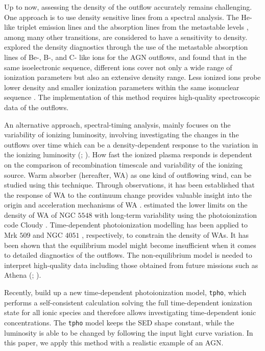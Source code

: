 \documentclass{aa}
\begin{document}
Up to now, assessing the density of the outflow accurately remains challenging.
One approach is to use density sensitive lines from a spectral analysis.
The He-like triplet emission lines \citep{Porquet2010SSR} and the absorption lines from the metastable levels \citep{Arav2015AA}, among many other transitions, are considered to have a sensitivity to density.
\cite{Mao2017A&A} explored the density diagnostics through the use of the metastable absorption lines of Be-, B-, and C- like ions for the AGN outflows, and found that in the same isoelectronic sequence, different ions cover not only a wide range of ionization parameters but also an extensive density range.
Less ionized ions probe lower density and smaller ionization parameters within the same isonuclear sequence \citep{Mao2017A&A}.
The implementation of this method requires high-quality spectroscopic data of the outflows.


An alternative approach, spectral-timing analysis, mainly focuses on the variability of ionizing luminosity, involving investigating the changes in the outflows over time which can be a density-dependent response to the variation in the ionizing luminosity (\citealp{Kaastra2012A&A}; \citealp{Rogantini2022ApJ}).
How fast the ionized plasma responds is dependent on the comparison of recombination timescale and variability of the ionizing source.
Warm absorber (hereafter, WA) as one kind of outflowing wind, can be studied using this technique.
Through observations, it has been established that the response of WA to the continuum change provides valuable insight into the origin and acceleration mechanisms of WA \citep{Laha2021NatAs}. 
\cite{Ebrero2016A&A} estimated the lower limits on the density of WA of NGC $5548$ with long-term variability using the photoionization code Cloudy \citep{Ferland1998PASP}. 
Time-dependent photoionization modelling has been applied to Mrk $509$ \citep{Kaastra2012A&A} and NGC $4051$ \citep{Silva2016A&A}, respectively, to constrain the density of WAs.
It has been shown that the equilibrium model might become insufficient when it comes to detailed diagnostics of the outflows.
The non-equilibrium model is needed to interpret high-quality data including those obtained from future missions such as Athena (\citealp{Sadaula2022arXiv}; \citealp{Juranova2022MNRAS}).



Recently, \cite{Rogantini2022ApJ} build up a new time-dependent photoionization model, \texttt{tpho}, which performs a self-consistent calculation solving the full time-dependent ionization state for all ionic species and therefore allows investigating time-dependent ionic concentrations. 
The \texttt{tpho} model keeps the SED shape constant, while the luminosity is able to be changed by following the input light curve variation.
In this paper, we apply this method with a realistic example of an AGN.
\end{document}

